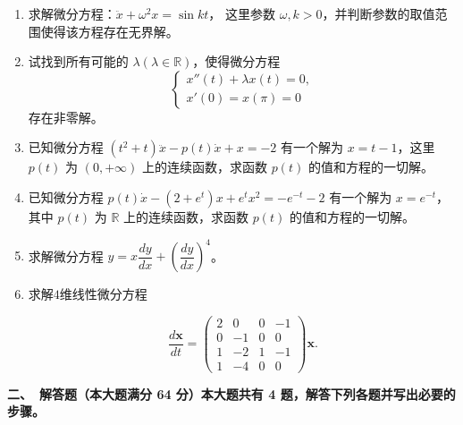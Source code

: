 \begin{enumerate}
\item[1.]求解微分方程：\( \ddot{x} + \omega^2 x = \sin kt \)，
这里参数 \( \omega, k > 0 \)，并判断参数的取值范围使得该方程存在无界解。

\item[2.]试找到所有可能的 \(\lambda (\lambda \in \mathbb{R})\)，使得微分方程  
\[
\begin{cases} 
x''(t) + \lambda x(t) = 0, \\ 
x'(0) = x(\pi) = 0 
\end{cases}
\]
存在非零解。


\item[3.]已知微分方程 \( (t^2 + t) \ddot{x} - p(t)\dot{x} + x = -2 \) 有一个解为 \( x = t - 1 \)，这里 \( p(t) \) 为 \( (0, +\infty) \) 上的连续函数，求函数 \( p(t) \) 的值和方程的一切解。


\item[4.]已知微分方程 \( p(t) \dot{x} - (2 + e^t)x + e^tx^2 = -e^{-t} - 2 \) 有一个解为 \( x = e^{-t} \)，其中 \( p(t) \) 为 \(\mathbb{R}\) 上的连续函数，求函数 \( p(t) \) 的值和方程的一切解。


\item[5.]求解微分方程 \( y = x \dfrac{dy}{dx} + \left( \dfrac{dy}{dx} \right)^4 \)。


\item[6.]求解$4$维线性微分方程

\[
\frac{d\boldsymbol{x}}{dt} =
\begin{pmatrix}
2 & 0 & 0 & -1 \\
0 & -1 & 0 & 0 \\
1 & -2 & 1 & -1 \\
1 & -4 & 0 & 0
\end{pmatrix}
\boldsymbol{x}.
\]
\end{enumerate}
\textbf{二、\ 解答题（本大题满分 64 分）本大题共有 4 题，解答下列各题并写出必要的步骤。}

